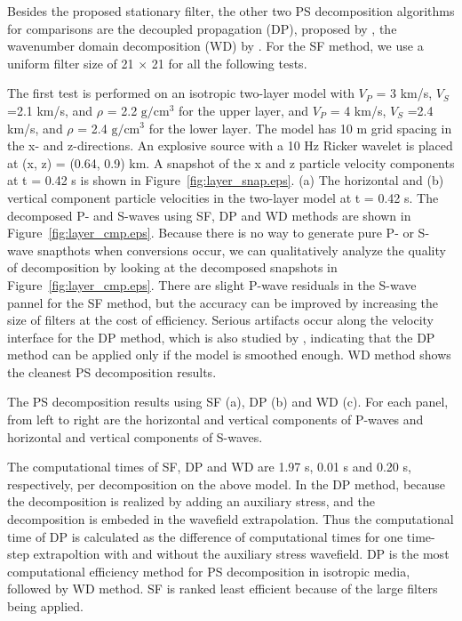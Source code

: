 \documentclass[manuscript,ulem,graphix,revised]{geophysics}
\begin{document}
Besides the proposed stationary filter, the other two PS decomposition algorithms for comparisons are the decoupled propagation (DP), proposed by \citet{ma03}, the wavenumber domain decomposition (WD) by \citet{zhang10}. For the SF method, we use a uniform filter size of 21 $\times$ 21 for all the following tests.

The first test is performed on an isotropic two-layer model with $V_P$ = 3 km/s, $V_S$ =2.1 km/s, and $\rho$ = 2.2 $\mathrm{g/cm^3}$ for the upper layer, and $V_P$ = 4 km/s, $V_S$ =2.4 km/s, and $\rho$ = 2.4 $\mathrm{g/cm^3}$ for the lower layer. 
The model has 10 m grid spacing in the x- and z-directions. An explosive source with a 10 Hz Ricker wavelet is placed at (x, z) = (0.64, 0.9) km. A snapshot of the x and z particle velocity components at t = 0.42 s is shown in Figure~\ref{fig:layer_snap.eps}.
{
(a) The horizontal and (b) vertical component particle velocities in the two-layer model at t = 0.42 s.
}
The decomposed P- and S-waves using SF, DP and WD methods are shown in Figure~\ref{fig:layer_cmp.eps}. Because there is no way to generate pure P- or S-wave snapthots when conversions occur, we can qualitatively analyze the quality of decomposition by looking at the decomposed snapshots in Figure~\ref{fig:layer_cmp.eps}. There are slight P-wave residuals in the S-wave pannel for the SF method, but the accuracy can be improved by increasing the size of filters at the cost of efficiency. Serious artifacts occur along the velocity interface for the DP method, which is also studied by \citet{wenlong_cmp15}, indicating that the DP method can be applied only if the model is smoothed enough. WD method shows the cleanest PS decomposition results. 

{
The PS decomposition results using SF (a), DP (b) and WD (c). For each panel, from left to right are the horizontal and vertical components of P-waves and horizontal and vertical components of S-waves.
}

The computational times of SF, DP and WD are 1.97 s, 0.01 s and 0.20 s, respectively, per decomposition on the above model. In the DP method, because the decomposition is realized by adding an auxiliary stress, and the decomposition is embeded in the wavefield extrapolation. Thus the computational time of DP is calculated as the difference of computational times for one time-step extrapoltion with and without the auxiliary stress wavefield. DP is the most computational efficiency method for PS decomposition in isotropic media, followed by WD method. SF is ranked least efficient because of the large filters being applied.
\end{document}
